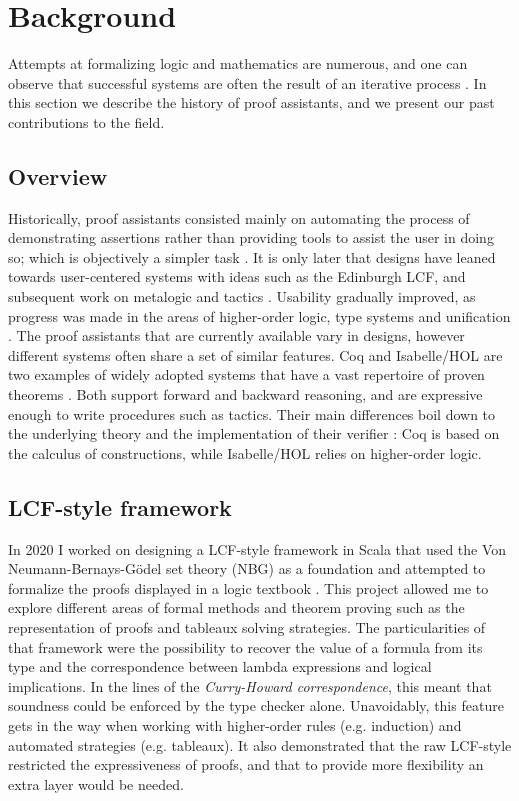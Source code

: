 \section{Background}
\label{sec:background}

Attempts at formalizing logic and mathematics are numerous, and one can observe that successful systems are often the result of an iterative process \cite{Paulson2019, Harrison2014, Asperti2007}. In this section we describe the history of proof assistants, and we present our past contributions to the field.

\subsection{Overview}

Historically, proof assistants consisted mainly on automating the process of demonstrating assertions rather than providing tools to assist the user in doing so; which is objectively a simpler task \cite{Harrison2014}. It is only later that designs have leaned towards user-centered systems with ideas such as the Edinburgh LCF, and subsequent work on metalogic and tactics \cite{Milner1984}. Usability gradually improved, as progress was made in the areas of higher-order logic, type systems and unification \cite{Paulson2019}. The proof assistants that are currently available vary in designs, however different systems often share a set of similar features. Coq and Isabelle/HOL are two examples of widely adopted systems that have a vast repertoire of proven theorems \cite{Yushkovskiy2018}. Both support forward and backward reasoning, and are expressive enough to write procedures such as tactics. Their main differences boil down to the underlying theory and the implementation of their verifier \cite{Barras1999, Wenzel2021}: Coq is based on the calculus of constructions, while Isabelle/HOL relies on higher-order logic.

\subsection{LCF-style framework}

In 2020 I worked on designing a LCF-style framework in Scala that used the Von Neumann-Bernays-Gödel set theory (NBG) as a foundation \cite{Cassayre2020} and attempted to formalize the proofs displayed in a logic textbook \cite{Mendelson2015}. This project allowed me to explore different areas of formal methods and theorem proving such as the representation of proofs and tableaux solving strategies. The particularities of that framework were the possibility to recover the value of a formula from its type and the correspondence between lambda expressions and logical implications. In the lines of the \textit{Curry-Howard correspondence}, this meant that soundness could be enforced by the type checker alone. Unavoidably, this feature gets in the way when working with higher-order rules (e.g. induction) and automated strategies (e.g. tableaux). It also demonstrated that the raw LCF-style restricted the expressiveness of proofs, and that to provide more flexibility an extra layer would be needed.

